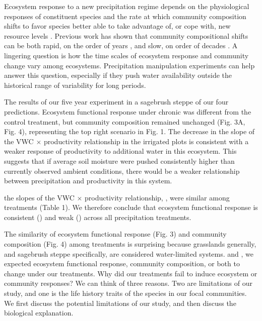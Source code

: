 \documentclass[fleqn,10pt,lineno]{wlpeerj} %
\begin{document}
Ecosystem response to a new precipitation regime depends on the
physiological responses of constituent species and the rate at which
community composition shifts to favor species better able to take
advantage of, or cope with, new resource levels \citep{Smith2009}.
Previous work has shown that community compositional shifts can be both
rapid, on the order of years \citep{Hoover2014}, and slow, on order of
decades \citep{Knapp2012, Wilcox2016}. A lingering question is how the
time scales of ecosystem response and community change vary among
ecosystems. Precipitation manipulation experiments can help answer this
question, especially if they push water availability outside the
historical range of variability for long periods.

The results of our five year experiment in a sagebrush steppe
 of our four predictions. Ecosystem functional
response under chronic  was different from
the control treatment, but community composition remained unchanged
(Fig. 3A, Fig. 4), representing the top right scenario in Fig. 1. The
decrease in the slope of the VWC \(\times\) productivity relationship in
the irrigated plots is consistent with a weaker response of productivity
to additional water in this ecosystem. This suggests that if average
soil moisture were pushed consistently higher than currently observed
ambient conditions, there would be a weaker relationship between
precipitation and productivity in this system.

 the slopes of the VWC
\(\times\) productivity relationship, , were
similar among treatments (Table 1). We therefore conclude that ecosystem
functional response is consistent () and weak
() across all precipitation
treatments.

The similarity of ecosystem functional response (Fig. 3) and community
composition (Fig. 4) among treatments is surprising because grasslands
generally, and sagebrush steppe specifically, are considered
water-limited systems.  \citet{Huxman2004} and
\citet{Knapp2015}
\citet{Wilcox2017}
, we expected ecosystem functional
response, community composition, or both to change under our treatments.
Why did our treatments fail to induce ecosystem or community responses?
We can think of three reasons. Two are limitations of our study, and one
is the life history traits of the species in our focal communities. We
first discuss the potential limitations of our study, and then discuss
the biological explanation.
\end{document}

